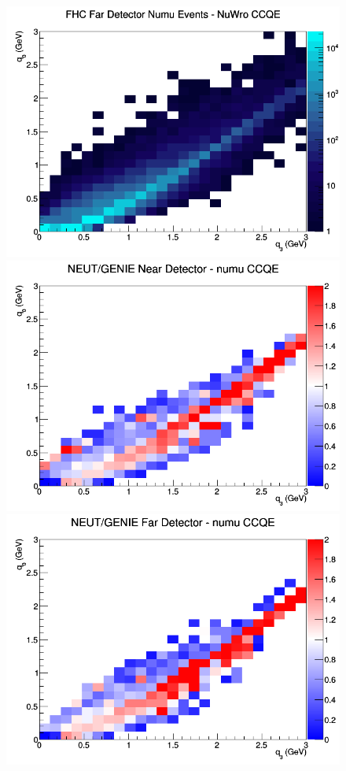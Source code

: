 \documentclass[12pt]{article}
\begin{document}
\begin{figure}[h]
\endminipage
{}
\includegraphics[width=\linewidth]{eff_q0_q3/GAr/CCQE_FHC_FD_numu_q3_q0_NuWro.png}
\endminipage
\newline
{}
\includegraphics[width=\linewidth]{eff_q0_q3/GAr/ratios/CCQE_NEUT_GENIE_numu_near_q3_q0.png}
\endminipage
{}
\includegraphics[width=\linewidth]{eff_q0_q3/GAr/ratios/CCQE_NEUT_GENIE_numu_far_q3_q0.png}

\end{figure}
\end{document}
